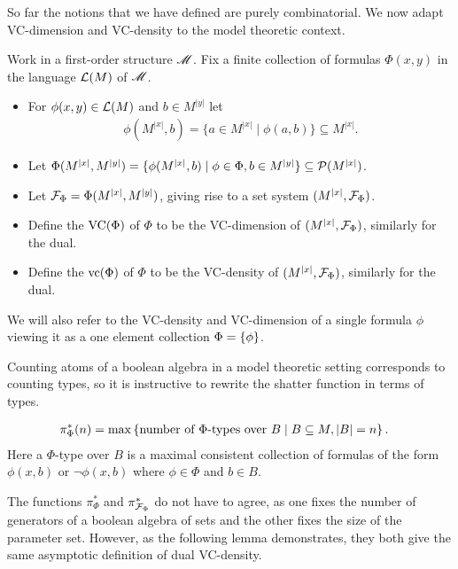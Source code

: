 So far the notions that we have defined are purely combinatorial.
We now adapt VC-dimension and VC-density to the model theoretic context.

\begin{Definition}
  Work in a first-order structure $\mathscr M$.
  Fix a finite collection of formulas $\Phi(x, y)$ in the language $\mathcal L(M)$ of $\mathscr M$.

  \begin{itemize}
  \item For $\phi(x, y) \in \mathcal L(M)$ and $b \in M^{|y|}$ let 
    \begin{align*}
      \phi(M^{|x|}, b) = \{a \in M^{|x|} \mid \phi(a, b)\} \subseteq M^{|x|}.
    \end{align*}
  \item Let $\Phi(M^{|x|}, M^{|y|})= \{\phi(M^{|x|}, b) \mid \phi \in \Phi, b \in M^{|y|}\} \subseteq \mathcal P(M^{|x|})$.
  \item Let $\mathcal F_\Phi = \Phi(M^{|x|}, M^{|y|})$, giving rise to a set system $(M^{|x|}, \mathcal F_\Phi)$.
  \item Define the  $\operatorname{VC}(\Phi)$ of $\Phi$ to be the VC-dimension of $(M^{|x|}, \mathcal F_\Phi)$, similarly for the dual.
  \item Define the  $\operatorname{vc}(\Phi)$ of $\Phi$ to be the VC-density of $(M^{|x|}, \mathcal F_\Phi)$, similarly for the dual.
  \end{itemize}

  We will also refer to the VC-density and VC-dimension of a single formula $\phi$
  viewing it as a one element collection $\Phi = \left\{\phi\right\}$.
\end{Definition}

Counting atoms of a boolean algebra in a model theoretic setting corresponds to counting types,
so it is instructive to rewrite the shatter function in terms of types.

\begin{Definition} 
  \begin{align*}
    \pi^*_\Phi(n) &= \max \left\{\text{number of $\Phi$-types over $B$} \mid B \subseteq M, |B| = n\right\}.
  \end{align*}
  Here a $\Phi$-type over $B$ is a maximal consistent collection of formulas of the form $\phi(x, b)$ or $\neg\phi(x, b)$
  where $\phi \in \Phi$ and $b \in B$.
\end{Definition}

The functions $\pi^*_{\Phi}$ and $\pi^*_{\mathcal F_\Phi}$ do not have to agree,
as one fixes the number of generators of a boolean algebra of sets and the other fixes the size of the parameter set.
However, as the following lemma demonstrates, they both give the same asymptotic definition of dual VC-density.

